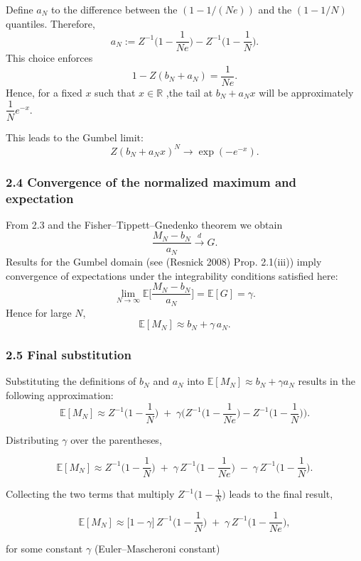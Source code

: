 \documentclass[
  12pt,
]{article}
\begin{document}
Define \(a_N\) to the difference between the \((1-1/(Ne))\) and the
\((1-1/N)\) quantiles. Therefore,\[
a_N := Z^{-1}\!\Big(1-\frac{1}{Ne}\Big) - Z^{-1}\!\Big(1-\frac{1}{N}\Big) \tag{4}.
\] This choice enforces \[
1 - Z(b_N + a_N) = \frac{1}{Ne}.
\] Hence, for a fixed \(x\) such that \(x \in \mathbb{R}\) ,the tail at
\(b_N + a_N x\) will be approximately \(\dfrac{1}{N}e^{-x}\).

This leads to the Gumbel limit: \[
Z(b_N + a_N x)^N \longrightarrow \exp(-e^{-x}) \tag{5}.
\]

\subsubsection{2.4 Convergence of the normalized maximum and
expectation}\label{convergence-of-the-normalized-maximum-and-expectation}

From 2.3 and the Fisher--Tippett--Gnedenko theorem we obtain \[
\frac{M_N - b_N}{a_N} \xrightarrow{d} G.
\]Results for the Gumbel domain (see (Resnick 2008) Prop. 2.1(iii))
imply convergence of expectations under the integrability conditions
satisfied here: \[
\lim_{N\to\infty} \mathbb{E}\!\Big[\frac{M_N - b_N}{a_N}\Big] = \mathbb{E}[G]=\gamma \tag{6}.
\] Hence for large \(N\), \[
\mathbb{E}[M_N] \approx b_N + \gamma\,a_N \tag{7}.
\]

\subsubsection{2.5 Final substitution}\label{final-substitution}

Substituting the definitions of \(b_N\) and \(a_N\) into
\(\mathbb{E}[M_N]\approx b_N+\gamma a_N\) results in the following
approximation: \[
\mathbb{E}[M_N] \approx Z^{-1}\!\Big(1-\frac{1}{N}\Big)
\;+\;\gamma\Big(Z^{-1}\!\Big(1-\frac{1}{Ne}\Big)-Z^{-1}\!\Big(1-\frac{1}{N}\Big)\Big).
\]

Distributing \(\gamma\) over the parentheses,

\[
\mathbb{E}[M_N] \approx Z^{-1}\!\Big(1-\frac{1}{N}\Big)
\;+\;\gamma\,Z^{-1}\!\Big(1-\frac{1}{Ne}\Big)
\;-\;\gamma\,Z^{-1}\!\Big(1-\frac{1}{N}\Big).
\]

Collecting the two terms that multiply
\(Z^{-1}\big(1-\tfrac{1}{N}\big)\) leads to the final result,

\[
\mathbb{E}[M_N] \approx \big[1 - \gamma\big]\,Z^{-1}\!\Big(1-\frac{1}{N}\Big)
\;+\;\gamma\,Z^{-1}\!\Big(1-\frac{1}{Ne}\Big),
\]

for some constant \(\gamma\) (Euler--Mascheroni constant)
\end{document}
